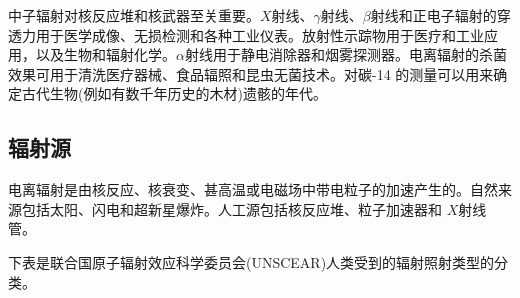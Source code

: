 中子辐射对核反应堆和核武器至关重要。$X$射线、$\gamma$射线、$\beta$射线和正电子辐射的穿透力用于医学成像、无损检测和各种工业仪表。放射性示踪物用于医疗和工业应用，以及生物和辐射化学。$\alpha$射线用于静电消除器和烟雾探测器。电离辐射的杀菌效果可用于清洗医疗器械、食品辐照和昆虫无菌技术。对碳-14 的测量可以用来确定古代生物(例如有数千年历史的木材)遗骸的年代。

\subsection{ 辐射源}
电离辐射是由核反应、核衰变、甚高温或电磁场中带电粒子的加速产生的。自然来源包括太阳、闪电和超新星爆炸。人工源包括核反应堆、粒子加速器和 $X$射线管。

下表是联合国原子辐射效应科学委员会(UNSCEAR)人类受到的辐射照射类型的分类。


